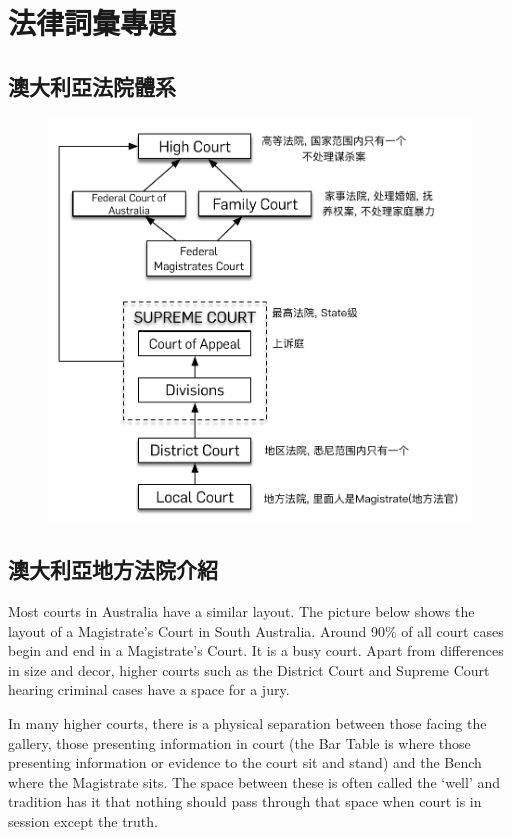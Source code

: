 \chapter{法律詞彙專題}
\section{澳大利亞法院體系}
\begin{figure}[H]
  \centering
  \includegraphics{pics/court.pdf}
\end{figure}



\section{澳大利亞地方法院介紹}
Most courts in Australia have a similar layout. The picture below shows the layout of a Magistrate’s Court in South Australia. Around 90\% of all court cases begin and end in a Magistrate’s Court. It is a busy court. Apart from differences in size and decor, higher courts such as the District Court and Supreme Court hearing criminal cases have a space for a jury.

In many higher courts, there is a physical separation between those facing the gallery, those presenting information in court (the Bar Table is where those presenting information or evidence to the court sit and stand) and the Bench where the Magistrate sits. The space between these is often called the `well' and tradition has it that nothing should pass through that space when court is in session except the truth.

